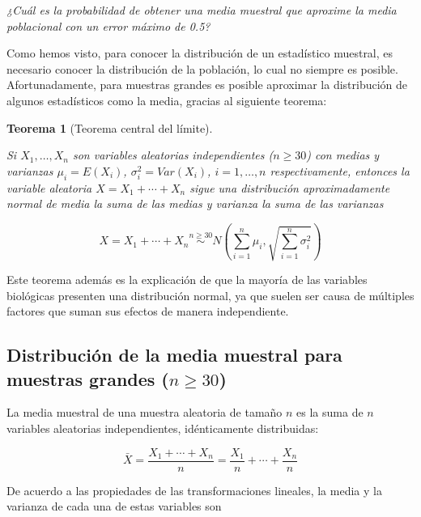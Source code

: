 \documentclass[
  a4paper,
]{scrreport}
\theoremstyle{plain}
\newtheorem{theorem}{Teorema}[chapter]
\theoremstyle{definition}
\theoremstyle{definition}
\theoremstyle{remark}
\begin{document}
\emph{¿Cuál es la probabilidad de obtener una media muestral que
aproxime la media poblacional con un error máximo de 0.5?}

Como hemos visto, para conocer la distribución de un estadístico
muestral, es necesario conocer la distribución de la población, lo cual
no siempre es posible. Afortunadamente, para muestras grandes es posible
aproximar la distribución de algunos estadísticos como la media, gracias
al siguiente teorema:

\begin{theorem}[Teorema central del
límite]\protect\hypertarget{thm-teorema-central-limite}{}\label{thm-teorema-central-limite}

Si \(X_1,\ldots, X_n\) son variables aleatorias independientes
(\(n\geq 30\)) con medias y varianzas \(\mu_i=E(X_i)\),
\(\sigma^2_i=Var(X_i)\), \(i=1,\ldots,n\) respectivamente, entonces la
variable aleatoria \(X=X_1+\cdots+X_n\) sigue una distribución
aproximadamente normal de media la suma de las medias y varianza la suma
de las varianzas

\[
X=X_1+\cdots+X_n\stackrel{n\geq 30} \sim N\left(\sum_{i=1}^n \mu_i, \sqrt{\sum_{i=1}^n \sigma^2_i}\right)
\]

\end{theorem}

Este teorema además es la explicación de que la mayoría de las variables
biológicas presenten una distribución normal, ya que suelen ser causa de
múltiples factores que suman sus efectos de manera independiente.

\hypertarget{distribuciuxf3n-de-la-media-muestral-para-muestras-grandes-ngeq-30}{%
\subsection{\texorpdfstring{Distribución de la media muestral para
muestras grandes
(\(n\geq 30\))}{Distribución de la media muestral para muestras grandes (n\textbackslash geq 30)}}\label{distribuciuxf3n-de-la-media-muestral-para-muestras-grandes-ngeq-30}}

La media muestral de una muestra aleatoria de tamaño \(n\) es la suma de
\(n\) variables aleatorias independientes, idénticamente distribuidas:

\[
\bar X = \frac{X_1+\cdots+X_n}{n} = \frac{X_1}{n}+\cdots+\frac{X_n}{n}
\]

De acuerdo a las propiedades de las transformaciones lineales, la media
y la varianza de cada una de estas variables son
\end{document}
